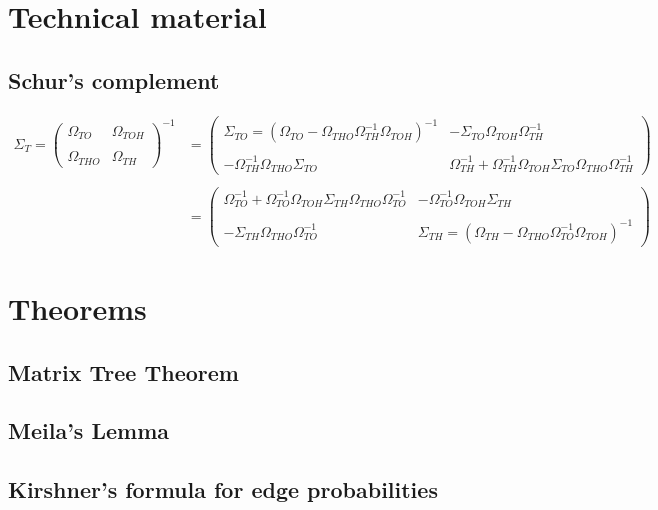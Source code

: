 \documentclass[11pt,a4paper]{article}
\begin{document}
\appendix
\section{Technical material}
\subsection{Schur's complement}
\begin{align*}
 \Sigma_T=
  \left( {\begin{array}{cc}
  \Omega_{TO} &  \Omega_{TOH}\\\\
  \Omega_{THO} & \Omega_{TH}
  \end{array} } \right)^{-1} &=
  \left( {\begin{array}{cc}
  \Sigma_{TO} =( \Omega_{TO} - \Omega_{THO}\Omega_{TH}^{-1}\Omega_{TOH})^{-1} &  - \Sigma_{TO} \Omega_{TOH}\Omega_{TH}^{-1}\\\\
 -\Omega_{TH}^{-1}\Omega_{THO}\Sigma_{TO} & \Omega_{TH}^{-1}+\Omega_{TH}^{-1}\Omega_{TOH}\Sigma_{TO}\Omega_{THO}\Omega_{TH}^{-1}
  \end{array} } \right)\\\\
  &=   \left( {\begin{array}{cc}
   \Omega_{TO}^{-1}+\Omega_{TO}^{-1}\Omega_{TOH}\Sigma_{TH}\Omega_{THO}\Omega_{TO}^{-1} & -\Omega_{TO}^{-1}\Omega_{TOH}\Sigma_{TH} \\\\
    -\Sigma_{TH}\Omega_{THO}\Omega_{TO}^{-1}&  \Sigma_{TH}= (\Omega_{TH} - \Omega_{THO}\Omega_{TO}^{-1}\Omega_{TOH})^{-1} 
   \end{array} } \right)
\end{align*}
  
\section{Theorems}
\subsection{Matrix Tree Theorem}
\subsection{Meila's Lemma}
\subsection{Kirshner's formula for edge probabilities}
\end{document}
